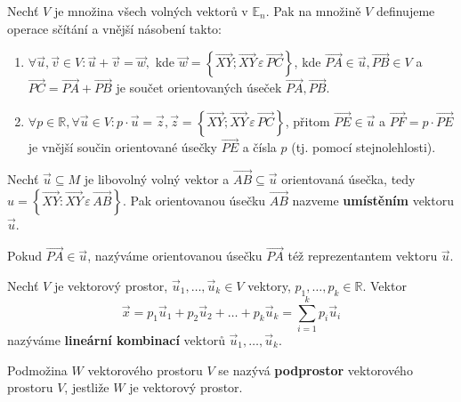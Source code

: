 \begin{definition}
    Nechť $V$ je množina všech volných vektorů v $\mathbb E_n$. Pak na množině $V$ definujeme
    operace sčítání a vnější násobení takto:
    \begin{enumerate}[$i.$]
    \item $\forall \vec u, \vec v \in V: \vec u + \vec v = \vec w,$ kde $\vec w = \left \{ \overrightarrow{XY}; \overrightarrow{XY} \, \varepsilon \, \overrightarrow{PC} \right \} $, kde $\overrightarrow{PA}\in\vec u, \overrightarrow{PB}\in V$ a $\overrightarrow{PC}=\overrightarrow{PA}+\overrightarrow{PB}$ je součet orientovaných úseček $\overrightarrow{PA},\overrightarrow{PB}.$
   	\item $\forall p \in \mathbb R, \forall \vec u \in V: p\cdot \vec u = \vec z, \vec z = \left \{ \overrightarrow{XY}; \overrightarrow{XY} \, \varepsilon \, \overrightarrow{PC} \right \} $, přitom $\overrightarrow{PE}\in \vec u$ a $\overrightarrow{PF} = p\cdot \overrightarrow{PE}$ je vnější součin orientované úsečky $\overrightarrow{PE}$ a čísla $p$ (tj. pomocí stejnolehlosti).
    \end{enumerate}
\end{definition}

\begin{definition}
Nechť $\vec u \subseteq M$ je libovolný volný vektor a $\overrightarrow{AB}\subseteq \vec u$ orientovaná úsečka, tedy
$u =\left  \{ \overrightarrow{XY} : \overrightarrow{XY} \, \varepsilon \, \overrightarrow{AB} \right \}$. Pak orientovanou úsečku $\overrightarrow{AB}$ nazveme \textbf{umístěním} vektoru $\vec u$.
\end{definition}

\begin{definition}
    Pokud $\overrightarrow{PA}\in \vec u$, nazýváme orientovanou úsečku $\overrightarrow{PA}$ též reprezentantem vektoru $\vec u$.
\end{definition}

\begin{definition}
    Nechť $V$ je vektorový prostor, $\vec u_1,\dots, \vec u_k\in V$ vektory, $p_1,\dots,
    p_k\in \mathbb R.$ Vektor
    $$\vec x = p_1\vec u_1 + p_2\vec u_2 + \dots + p_k\vec u_k = \sum_{i=1}^{k} p_i\vec u_i$$
    nazýváme \textbf{lineární kombinací} vektorů $\vec u_1,\dots, \vec u_k.$
\end{definition}

\begin{definition}
    Podmožina $W$ vektorového prostoru $V$ se nazývá \textbf{podprostor} vektorového
    prostoru $V$, jestliže $W$ je vektorový prostor.
\end{definition}

